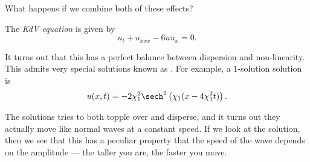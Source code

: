 \documentclass[a4paper]{article}
\begin{document}
What happens if we combine both of these effects?
\begin{defi}
  The \emph{KdV equation} is given by
  \[
    u_t + u_{xxx} - 6 u u_x = 0.
  \]
\end{defi}
It turns out that this has a perfect balance between dispersion and non-linearity. This admits very special solutions known as . For example, a $1$-solution solution is
\[
  u(x, t) = -2 \chi_1^2 \sech^2\left(\chi_1 (x - 4 \chi_1^2 t)\right).
\]
\begin{center}
\end{center}
The solutions tries to both topple over and disperse, and it turns out they actually move like normal waves at a constant speed. If we look at the solution, then we see that this has a peculiar property that the speed of the wave depends on the amplitude --- the taller you are, the faster you move.
\end{document}
